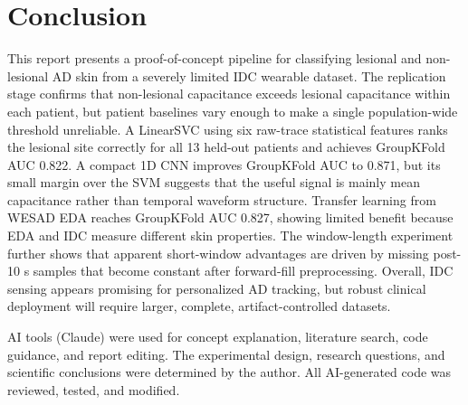 \documentclass[acmtog]{acmart}
\begin{document}
\section{Conclusion}\label{sec:conclusion}
This report presents a proof-of-concept pipeline for classifying lesional and
non-lesional AD skin from a severely limited IDC wearable dataset. The replication
stage confirms that non-lesional capacitance exceeds lesional capacitance within
each patient, but patient baselines vary enough to make a single population-wide
threshold unreliable. A LinearSVC using six raw-trace statistical features ranks
the lesional site correctly for all 13 held-out patients and achieves GroupKFold
AUC 0.822. A compact 1D CNN improves GroupKFold AUC to 0.871, but its small margin
over the SVM suggests that the useful signal is mainly mean capacitance rather
than temporal waveform structure. Transfer learning from WESAD EDA reaches
GroupKFold AUC 0.827, showing limited benefit because EDA and IDC measure
different skin properties. The window-length experiment further shows that
apparent short-window advantages are driven by missing post-10 s samples that
become constant after forward-fill preprocessing. Overall,
IDC sensing appears promising for personalized AD tracking, but robust clinical
deployment will require larger, complete, artifact-controlled datasets.

\begin{acks}
AI tools (Claude) were used for concept explanation, literature search, code
guidance, and report editing. The experimental design, research questions, and
scientific conclusions were determined by the author. All AI-generated code was
reviewed, tested, and modified.
\end{acks}



\end{document}
